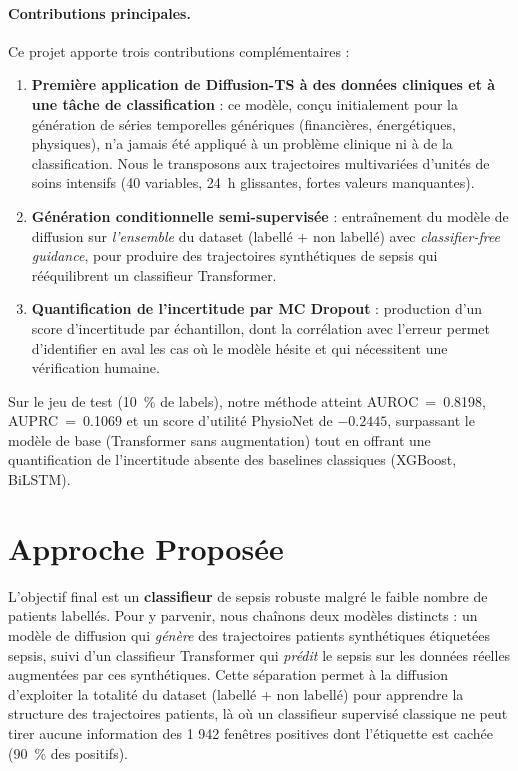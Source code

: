 \documentclass[11pt,a4paper]{article}
\begin{document}
\paragraph{Contributions principales.} Ce projet apporte trois contributions complémentaires :
\begin{enumerate}[leftmargin=2em, itemsep=0.2em]
    \item \textbf{Première application de Diffusion-TS à des données cliniques et à une
    tâche de classification} : ce modèle, conçu initialement pour la génération de séries
    temporelles génériques (financières, énergétiques, physiques), n'a jamais été appliqué
    à un problème clinique ni à de la classification. Nous le transposons aux trajectoires
    multivariées d'unités de soins intensifs (40 variables, 24~h glissantes, fortes valeurs
    manquantes).
    \item \textbf{Génération conditionnelle semi-supervisée} : entraînement du modèle de
    diffusion sur \emph{l'ensemble} du dataset (labellé + non labellé) avec
    \emph{classifier-free guidance}, pour produire des trajectoires synthétiques de
    sepsis qui rééquilibrent un classifieur Transformer.
    \item \textbf{Quantification de l'incertitude par MC Dropout} : production d'un score
    d'incertitude par échantillon, dont la corrélation avec l'erreur permet d'identifier
    en aval les cas où le modèle hésite et qui nécessitent une vérification humaine.
\end{enumerate}

Sur le jeu de test (10~\% de labels), notre méthode atteint AUROC~=~0.8198,
AUPRC~=~0.1069 et un score d'utilité PhysioNet de $-0.2445$, surpassant le modèle
de base (Transformer sans augmentation) tout en offrant une quantification de
l'incertitude absente des baselines classiques (XGBoost, BiLSTM).


\section{Approche Proposée}

L'objectif final est un \textbf{classifieur} de sepsis robuste malgré le faible nombre de
patients labellés. Pour y parvenir, nous chaînons deux modèles distincts : un modèle de
diffusion qui \emph{génère} des trajectoires patients synthétiques étiquetées sepsis,
suivi d'un classifieur Transformer qui \emph{prédit} le sepsis sur les données réelles
augmentées par ces synthétiques. Cette séparation permet à la diffusion d'exploiter la
totalité du dataset (labellé + non labellé) pour apprendre la structure des trajectoires
patients, là où un classifieur supervisé classique ne peut tirer aucune information
des 1 942 fenêtres positives dont l'étiquette est cachée (90~\% des positifs).
\end{document}
